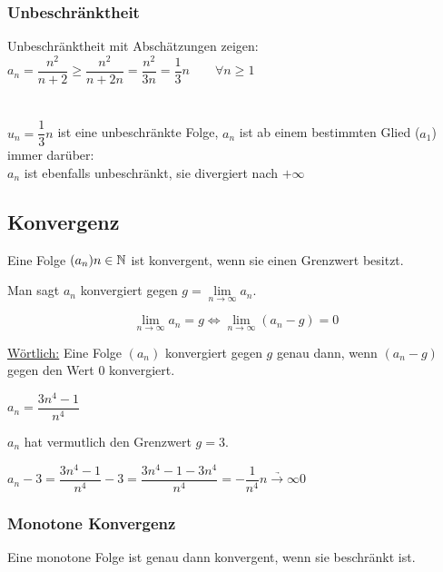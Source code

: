 \documentclass[main.tex]{subfiles}
\begin{document}
		\subsubsection{Unbeschränktheit}

\begin{Beispiel}
Unbeschränktheit mit Abschätzungen zeigen:\\
$a_n=\dfrac{n^2}{n+2}\geq\dfrac{n^2}{n+2n}=\dfrac{n^2}{3n}=\dfrac{1}{3}n\qquad\forall n\geq1$\\\\
\\$u_n=\dfrac{1}{3}n$ ist eine unbeschränkte Folge, $a_n$ ist ab einem bestimmten Glied ($a_1$) immer darüber:
\\$a_n$ ist ebenfalls unbeschränkt, sie divergiert nach $+\infty$
\end{Beispiel}


	\subsection{Konvergenz}

\begin{Definition}
Eine Folge $(a_n)n\in\mathbb{N}$ ist konvergent, wenn sie einen Grenzwert besitzt.

Man sagt $a_n$ konvergiert gegen $g=\lim\limits_{n\to\infty}a_n$.
\end{Definition}



\begin{Theorem}

$$\lim\limits_{n\to\infty}a_n=g\Leftrightarrow \lim\limits_{n\to\infty}(a_n-g)=0$$
\end{Theorem}

\underline{Wörtlich:} Eine Folge $(a_n)$ konvergiert gegen $g$ genau dann, wenn $(a_n-g)$ gegen den Wert $0$ konvergiert.

\begin{Beispiel}
	$a_n=\dfrac{3n^4-1}{n^4}$

	$a_n$ hat vermutlich den Grenzwert $g=3$.

	$a_n-3=\dfrac{3n^4-1}{n^4}-3=\dfrac{3n^4-1-3n^4}{n^4}=-\dfrac{1}{n^4}\underrightarrow{n\rightarrow \infty}0$
\end{Beispiel}
\subsubsection{Monotone Konvergenz}


\begin{Theorem}
Eine monotone Folge ist genau dann konvergent, wenn sie beschränkt ist.
\end{Theorem}
\end{document}
